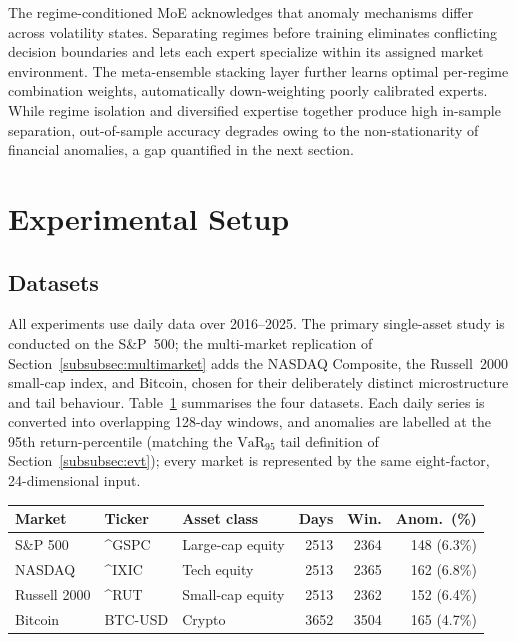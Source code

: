 \documentclass[]{interact}
\begin{document}
The regime-conditioned MoE acknowledges that anomaly mechanisms differ across volatility states. Separating regimes before training eliminates conflicting decision boundaries and lets each expert specialize within its assigned market environment. The meta-ensemble stacking layer further learns optimal per-regime combination weights, automatically down-weighting poorly calibrated experts. While regime isolation and diversified expertise together produce high in-sample separation, out-of-sample accuracy degrades owing to the non-stationarity of financial anomalies, a gap quantified in the next section.

\section{Experimental Setup}
\label{sec:experimental}

\subsection{Datasets}
\label{subsec:datasets}

All experiments use daily data over 2016--2025. The primary single-asset study is conducted on the S\&P~500; the multi-market replication of Section~\ref{subsubsec:multimarket} adds the NASDAQ Composite, the Russell~2000 small-cap index, and Bitcoin, chosen for their deliberately distinct microstructure and tail behaviour. Table~\ref{tab:datasets} summarises the four datasets. Each daily series is converted into overlapping 128-day windows, and anomalies are labelled at the 95th return-percentile (matching the $\text{VaR}_{95}$ tail definition of Section~\ref{subsubsec:evt}); every market is represented by the same eight-factor, 24-dimensional input.

\begin{table}[!t]
{\scriptsize
\renewcommand{\arraystretch}{1.25}
\setlength{\tabcolsep}{2.5pt}
\begin{tabular}{llp{1.7cm}rrr}
\toprule
\textbf{Market} & \textbf{Ticker} & \textbf{Asset class} & \textbf{Days} & \textbf{Win.} & \textbf{Anom.\ (\%)} \\
\midrule
S\&P 500     & \^{}GSPC   & Large-cap equity & 2513 & 2364 & 148 (6.3\%) \\
NASDAQ       & \^{}IXIC   & Tech equity      & 2513 & 2365 & 162 (6.8\%) \\
Russell 2000 & \^{}RUT    & Small-cap equity & 2513 & 2362 & 152 (6.4\%) \\
Bitcoin      & BTC-USD    & Crypto           & 3652 & 3504 & 165 (4.7\%) \\
\bottomrule
\end{tabular}}
\label{tab:datasets}
\end{table}
\end{document}
